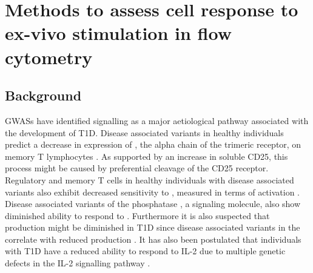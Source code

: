 \chapter{ \label{chapter:il2} Methods to assess cell response to ex-vivo stimulation in flow cytometry }


\section{Background}

\Glspl{GWAS} have identified  signalling as a major aetiological pathway associated with the development of T1D.  
Disease associated  variants in healthy individuals predict a decrease in expression of ,
the alpha chain of the trimeric  receptor, on memory \positive T lymphocytes \citep{Dendrou:2008gc,Dendrou:2009dv}.
As supported by an increase in soluble CD25, this process might be caused by preferential cleavage of the CD25 receptor.  
Regulatory and memory \positive T cells in healthy individuals with disease associated  variants also exhibit decreased sensitivity to ,
measured in terms of  activation \citep{Garg:2012jr}.
Disease associated variants of the phosphatase , a signaling molecule, also show diminished ability to respond to  \citep{Long:2011hk}.
Furthermore it is also suspected that  production might be diminished in T1D since disease associated variants in the  correlate with
reduced  production \citep{Dendrou:2009dv}.
It has also been postulated that individuals with T1D have a reduced ability to respond to IL-2 due to multiple genetic defects in the IL-2 signalling 
pathway \citep{Long:2010ej}.

